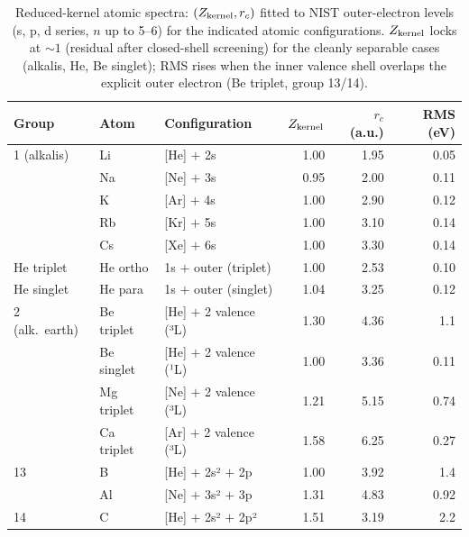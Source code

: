 \documentclass[11pt]{article}
\begin{document}
\begin{table}[h]
\centering
\small
\begin{tabular}{lllrrr}
\toprule
Group & Atom & Configuration & $Z_{\rm kernel}$ & $r_c$ (a.u.) & RMS (eV) \\
\midrule
1 (alkalis) & Li & [He] $+$ 2s    & 1.00 & 1.95 & 0.05 \\
            & Na & [Ne] $+$ 3s    & 0.95 & 2.00 & 0.11 \\
            & K  & [Ar] $+$ 4s    & 1.00 & 2.90 & 0.12 \\
            & Rb & [Kr] $+$ 5s    & 1.00 & 3.10 & 0.14 \\
            & Cs & [Xe] $+$ 6s    & 1.00 & 3.30 & 0.14 \\
\midrule
He triplet  & He ortho & 1s $+$ outer (triplet) & 1.00 & 2.53 & 0.10 \\
He singlet  & He para  & 1s $+$ outer (singlet) & 1.04 & 3.25 & 0.12 \\
\midrule
2 (alk.\ earth) & Be triplet & [He] $+$ 2 valence (³L) & 1.30 & 4.36 & 1.1 \\
                & Be singlet & [He] $+$ 2 valence (¹L) & 1.00 & 3.36 & 0.11 \\
                & Mg triplet & [Ne] $+$ 2 valence (³L) & 1.21 & 5.15 & 0.74 \\
                & Ca triplet & [Ar] $+$ 2 valence (³L) & 1.58 & 6.25 & 0.27 \\
\midrule
13 & B  & [He] $+$ 2s² $+$ 2p   & 1.00 & 3.92 & 1.4 \\
   & Al & [Ne] $+$ 3s² $+$ 3p   & 1.31 & 4.83 & 0.92 \\
\midrule
14 & C  & [He] $+$ 2s² $+$ 2p²  & 1.51 & 3.19 & 2.2 \\
\bottomrule
\end{tabular}
\caption{Reduced-kernel atomic spectra: $(Z_{\rm kernel}, r_c)$ fitted to NIST outer-electron levels (s, p, d series, $n$ up to 5--6) for the indicated atomic configurations. $Z_{\rm kernel}$ locks at $\sim 1$ (residual after closed-shell screening) for the cleanly separable cases (alkalis, He, Be singlet); RMS rises when the inner valence shell overlaps the explicit outer electron (Be triplet, group 13/14).}
\label{tab:spectra}
\end{table}
\end{document}
